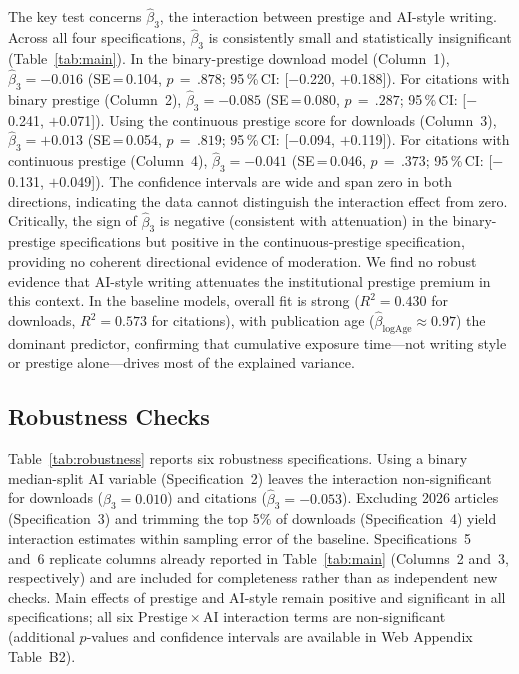 \documentclass[12pt,a4paper]{article}
\begin{document}
The key test concerns $\hat{\beta}_3$, the interaction between prestige
and AI-style writing.
Across all four specifications, $\hat{\beta}_3$ is consistently small
and statistically insignificant (Table~\ref{tab:main}).
In the binary-prestige download model (Column~1),
$\hat{\beta}_3 = -0.016$ (SE\,=\,0.104, $p\,=\,.878$;
95\,\%\,CI: [$-$0.220, $+$0.188]).
For citations with binary prestige (Column~2),
$\hat{\beta}_3 = -0.085$ (SE\,=\,0.080, $p\,=\,.287$;
95\,\%\,CI: [$-$0.241, $+$0.071]).
Using the continuous prestige score for downloads (Column~3),
$\hat{\beta}_3 = +0.013$ (SE\,=\,0.054, $p\,=\,.819$;
95\,\%\,CI: [$-$0.094, $+$0.119]).
For citations with continuous prestige (Column~4),
$\hat{\beta}_3 = -0.041$ (SE\,=\,0.046, $p\,=\,.373$;
95\,\%\,CI: [$-$0.131, $+$0.049]).
The confidence intervals are wide and span zero in both directions,
indicating the data cannot distinguish the interaction effect from zero.
Critically, the sign of $\hat{\beta}_3$ is negative (consistent with
attenuation) in the binary-prestige specifications but positive in the
continuous-prestige specification, providing no coherent directional
evidence of moderation.
We find no robust evidence that AI-style writing attenuates the
institutional prestige premium in this context.
In the baseline models, overall fit is strong ($R^2 = 0.430$ for
downloads, $R^2 = 0.573$ for citations), with publication age
($\hat{\beta}_{\log\text{Age}}\approx 0.97$) the dominant predictor,
confirming that cumulative exposure time---not writing style or
prestige alone---drives most of the explained variance.

\subsection{Robustness Checks}

Table~\ref{tab:robustness} reports six robustness specifications.
Using a binary median-split AI variable (Specification~2) leaves
the interaction non-significant for downloads
($\hat{\beta}_3 = 0.010$) and citations ($\hat{\beta}_3 = -0.053$).
Excluding 2026 articles (Specification~3) and trimming the top 5\%
of downloads (Specification~4) yield interaction estimates within
sampling error of the baseline.
Specifications~5 and~6 replicate columns already reported in
Table~\ref{tab:main} (Columns~2 and~3, respectively) and are included
for completeness rather than as independent new checks.
Main effects of prestige and AI-style remain positive and significant
in all specifications; all six Prestige\,$\times$\,AI interaction
terms are non-significant (additional $p$-values and confidence
intervals are available in Web Appendix Table~B2).
\end{document}
